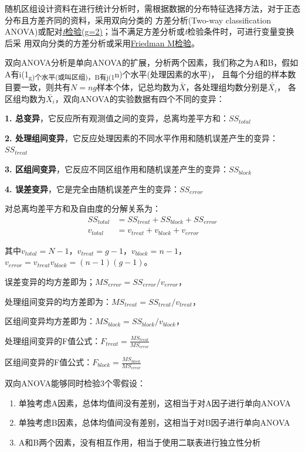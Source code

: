 \documentclass[
]{article}
\begin{document}
随机区组设计资料在进行统计分析时，需根据数据的分布特征选择方法，对于正态分布且方差齐同的资料，采用双向分类的
方差分析(Two-way classification ANOVA)或配对\protect\hyperlink{ux2atux2aux5cux2520ux68c0ux9a8cux7684ux5206ux7c7bux53caux5e94ux7528}{\emph{t}检验(g=2)}；当不满足方差分析或\emph{t}检验条件时，可进行变量变换后采
用双向分类的方差分析或采用\protect\hyperlink{Friedmanux5cux2520Mux68c0ux9a8c}{Friedman M检验}。

双向ANOVA分析是单向ANOVA的扩展，分析两个因素，我们称之为A和B，假如A有i(1\textsubscript{g)个水平(或叫区组)，B有j(1}n)个水平(处理因素的水平)，
且每个分组的样本数目要一致，则共有\(N=ng\)样本个体，记总均数为\(\bar{X}\)，各处理组均数分别是\(\bar{X_i}\)，
各区组均数为\(\bar{X_{i}}\)，双向ANOVA的实验数据有四个不同的变异：

\textbf{1. 总变异}，它反应所有观测值之间的变异，总离均差平方和：\(SS_{total}\)

\textbf{2. 处理组间变异}，它反应处理因素的不同水平作用和随机误差产生的变异：\(SS_{treat}\)

\textbf{3. 区组间变异}，它反应不同区组作用和随机误差产生的变异：\(SS_{block}\)

\textbf{4. 误差变异}，它是完全由随机误差产生的变异：\(SS_{error}\)

对总离均差平方和及自由度的分解关系为：
\[\begin{aligned}
SS_{total} & = SS_{treat}+SS_{block}+SS_{error} \\
v_{total} & = v_{treat}+v_{block}+v_{error}
\end{aligned}\]

其中\(v_{total}=N-1\)，\(v_{treat}=g-1\)，\(v_{block}=n-1\)，
\(v_{error}=v_{treat}v_{block}=(n-1)(g-1)\)。

误差变异的均方差即为；\(MS_{error}=SS_{error}/v_{error}\)，

处理组间变异的均方差即为：\(MS_{treat}=SS_{treat}/v_{treat}\)，

区组间变异均方差即为：\(MS_{block}=SS_{block}/v_{block}\)，

处理组间变异的F值公式：\(F_{treat}=\frac{MS_{treat}}{MS_{error}}\)

区组间变异的F值公式：\(F_{block}=\frac{MS_{block}}{MS_{error}}\)

双向ANOVA能够同时检验3个零假设：

\begin{enumerate}
\def\labelenumi{\arabic{enumi}.}
\item
  单独考虑A因素，总体均值间没有差别，这相当于对A因子进行单向ANOVA
\item
  单独考虑B因素，总体均值间没有差别，这相当于对B因子进行单向ANOVA
\item
  A和B两个因素，没有相互作用，相当于使用二联表进行独立性分析
\end{enumerate}
\end{document}
